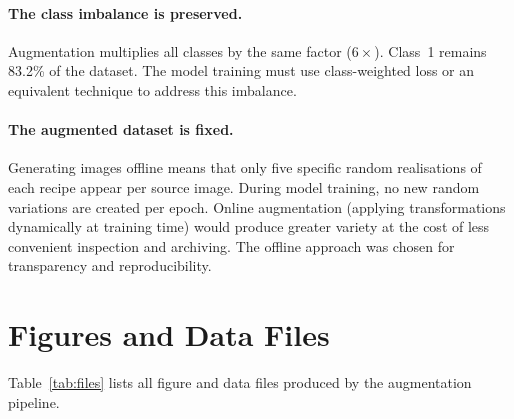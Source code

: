 \documentclass[11pt,a4paper]{article}
\newcommand{\pct}[1]{#1\%}
\begin{document}
\paragraph{The class imbalance is preserved.}
Augmentation multiplies all classes by the same factor ($6\times$). Class~1 remains \pct{83.2} of the dataset. The model training must use class-weighted loss or an equivalent technique to address this imbalance.

\paragraph{The augmented dataset is fixed.}
Generating images offline means that only five specific random realisations of each recipe appear per source image. During model training, no new random variations are created per epoch. Online augmentation (applying transformations dynamically at training time) would produce greater variety at the cost of less convenient inspection and archiving. The offline approach was chosen for transparency and reproducibility.

\section{Figures and Data Files}
\label{sec:files}

Table~\ref{tab:files} lists all figure and data files produced by the augmentation pipeline.
\end{document}
